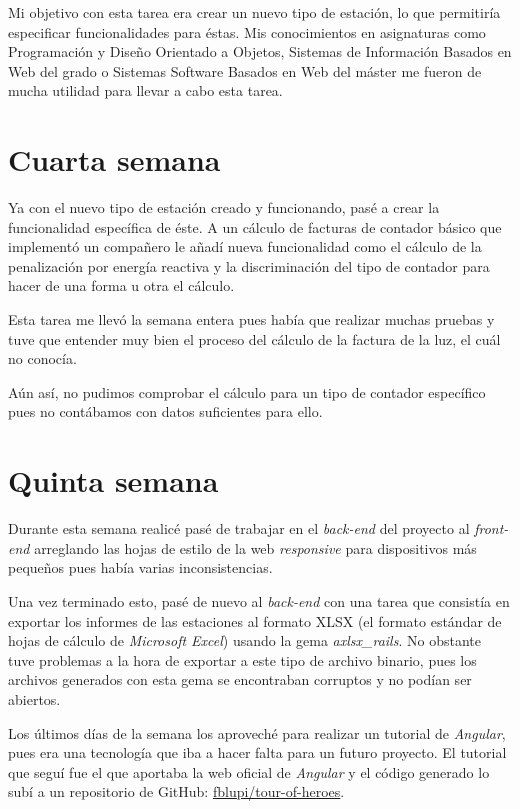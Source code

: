 Mi objetivo con esta tarea era crear un nuevo tipo de estación, lo que permitiría especificar funcionalidades para éstas. Mis conocimientos en asignaturas como Programación y Diseño Orientado a Objetos, Sistemas de Información Basados en Web del grado o Sistemas Software Basados en Web del máster me fueron de mucha utilidad para llevar a cabo esta tarea.

\section{Cuarta semana}

Ya con el nuevo tipo de estación creado y funcionando, pasé a crear la funcionalidad específica de éste. A un cálculo de facturas de contador básico que implementó un compañero le añadí nueva funcionalidad como el cálculo de la penalización por energía reactiva y la discriminación del tipo de contador para hacer de una forma u otra el cálculo.

Esta tarea me llevó la semana entera pues había que realizar muchas pruebas y tuve que entender muy bien el proceso del cálculo de la factura de la luz, el cuál no conocía.

Aún así, no pudimos comprobar el cálculo para un tipo de contador específico pues no contábamos con datos suficientes para ello.

\section{Quinta semana}

Durante esta semana realicé pasé de trabajar en el \textit{back-end} del proyecto al \textit{front-end} arreglando las hojas de estilo de la web \textit{responsive} para dispositivos más pequeños pues había varias inconsistencias.

Una vez terminado esto, pasé de nuevo al \textit{back-end} con una tarea que consistía en exportar los informes de las estaciones al formato XLSX (el formato estándar de hojas de cálculo de \textit{Microsoft Excel}) usando la gema \textit{axlsx\_rails}. No obstante tuve problemas a la hora de exportar a este tipo de archivo binario, pues los archivos generados con esta gema se encontraban corruptos y no podían ser abiertos.

Los últimos días de la semana los aproveché para realizar un tutorial de \textit{Angular}, pues era una tecnología que iba a hacer falta para un futuro proyecto. El tutorial que seguí fue el que aportaba la web oficial de \textit{Angular} y el código generado lo subí a un repositorio de GitHub: \href{https://github.com/fblupi/tour-of-heroes}{fblupi/tour-of-heroes}.
